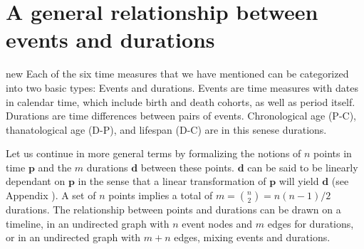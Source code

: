 \documentclass[12pt,oneside,a4paper]{article} %
\newcommand\vt[1]{\textcolor{rd}{#1}}
\begin{document}

\FloatBarrier

\section{A general relationship between events and durations}
\vt{new}
Each of the six time measures that we have mentioned can be categorized into
two basic types: Events and durations. Events are time measures with dates in
calendar time, which include birth and death cohorts, as well as period itself.
Durations are time differences between pairs of
events. Chronological age (P-C), thanatological age (D-P), and lifespan (D-C)
are in this senese durations. 

Let us continue in more general terms by formalizing
the notions of $n$ points in time $\textbf{p}$ and the $m$ durations $\textbf{d}$
between these points. $\textbf{d}$ can be said to be linearly dependant on
$\textbf{p}$ in the sense that a linear transformation of $\textbf{p}$ will
yield $\textbf{d}$ (see \vt{Appendix} ).
A set of $n$ points implies a total of $m = \binom{n}{2} = n(n - 1)/2$
durations.
The relationship between points and durations can be drawn on a timeline, in an undirected graph with $n$ event nodes and $m$ edges for
durations, or in an undirected graph with $m+n$ edges, mixing events and
durations.
\end{document}
